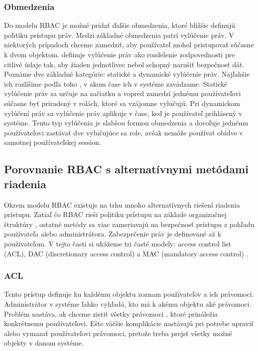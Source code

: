 \subsubsection{Obmedzenia}
Do modelu RBAC je možné pridať ďalšie obmedzenia, ktoré bližšie definujú politiku prístupu práv. Medzi základné obmedzenia patrí vylúčenie práv. V niektorých prípadoch chceme zamedziť, aby používateľ mohol pristupovať súčasne k dvom objektom. \cite{telecom} definuje vylúčenie práv ako rozdelenie zodpovednosti pre citlivé údaje tak, aby žiaden jednotlivec nebol schopný narušiť bezpečnosť dát. Poznáme dve základné kategórie: statické a dynamické vylúčenie práv. Najľahšie ich rozlíšime podľa toho , v akom čase ich v systéme zavádzame. Statické vylúčenie práv sa určuje na začiatku a vopred zamedzí jednému používateľovi súčasne byť priradený v rolách, ktoré sa vzájomne vylučujú. Pri dynamickom vylúčení práv sa vylúčenie práv aplikuje v čase, keď je používateľ prihlásený v systéme. Tento typ vylúčenia je slabšou formou obmedzenia a dovoľuje jednému používateľovi zastávať dve vylučujúce sa role, avšak nemôže používať obidve v samotnej používateľskej session.



\subsection{Porovnanie RBAC s alternatívnymi metódami riadenia}
Okrem modelu RBAC existuje na trhu mnoho alternatívnych riešení riadenia prístupu. Zatiaľ čo RBAC rieši politiku prístupu na základe organizačnej štruktúry , ostatné metódy sa viac zameriavajú na bezpečnosť prístupu z pohľadu používateľa alebo administrátora. Zabezpečenie práv je definované až k používateľom.
V tejto časti si ukážeme tri časté modely: access control list (ACL), DAC (discretionary access control) a MAC (mandatory access control) .


\subsubsection{ACL}
Tento prístup definuje ku každému objektu zoznam používateľov a ich právomocí. Administrátor v systéme ľahko vyhľadá, kto má k akému objektu aké právomoci. Problém nastáva, ak chceme zistiť všetky právomoci , ktoré prináležia konkrétnemu používateľovi. Ešte väčšie komplikácie nastávajú pri potrebe upraviť alebo vymazať používateľovi  právomoci, pretože treba prejsť všetky možné objekty v danom systéme. 



